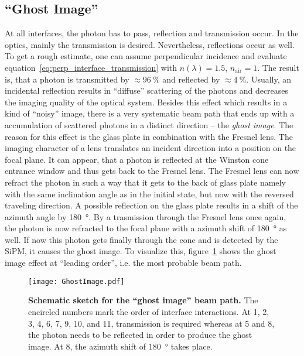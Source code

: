 
\subsection{\enquote{Ghost Image}}\label{sec:ghost_image}

At all interfaces, the photon has to pass, reflection and transmission occur. In the \iceact optics, mainly the transmission is desired. Nevertheless, reflections occur as well. To get a rough estimate, one can assume perpendicular incidence and evaluate equation~\eqref{eq:perp_interface_transmission} with $n(\lambda)=\num{1.5}$, $n_\text{air}=1$. The result is, that a photon is transmitted by $\approx\SI{96}{\percent}$ and reflected by $\approx\SI{4}{\percent}$. Usually, an incidental reflection results in \enquote{diffuse} scattering of the photons and decreases the imaging quality of the optical system. Besides this effect which results in a kind of \enquote{noisy} image, there is a very systematic beam path that ends up with a accumulation of scattered photons in a distinct direction -- the \textit{ghost image}. The reason for this effect is the glass plate in combination with the Fresnel lens. The imaging character of a lens translates an incident direction into a position on the focal plane. It can appear, that a photon is reflected at the Winston cone entrance window and thus gets back to the Fresnel lens. The Fresnel lens can now refract the photon in such a way that it gets to the back of glass plate namely with the same inclination angle as in the initial state, but now with the reversed traveling direction. A possible reflection on the glass plate results in a shift of the azimuth angle by \SI{180}{\degree}. By a trasmission through the Fresnel lens once again, the photon is now refracted to the focal plane with a azimuth shift of \SI{180}{\degree} as well. If now this photon gets finally through the cone and is detected by the SiPM, it causes the ghost image. To visualize this, figure~\ref{ghostimage_path} shows the ghost image effect at \enquote{leading order}, i.e. the most probable beam path.

\begin{figure}[H]
	\centering
	\texttt{[image: GhostImage.pdf]}
	\caption[Schematic sketch for the \enquote{ghost image} beam path]{\textbf{Schematic sketch for the \enquote{ghost image} beam path.} The encircled numbers mark the order of interface interactions. At 1, 2, 3, 4, 6, 7, 9, 10, and 11, transmission is required whereas at 5 and 8, the photon needs to be reflected in order to produce the ghost image. At 8, the azimuth shift of \SI{180}{\degree} takes place.}
	\label{ghostimage_path}
\end{figure}

